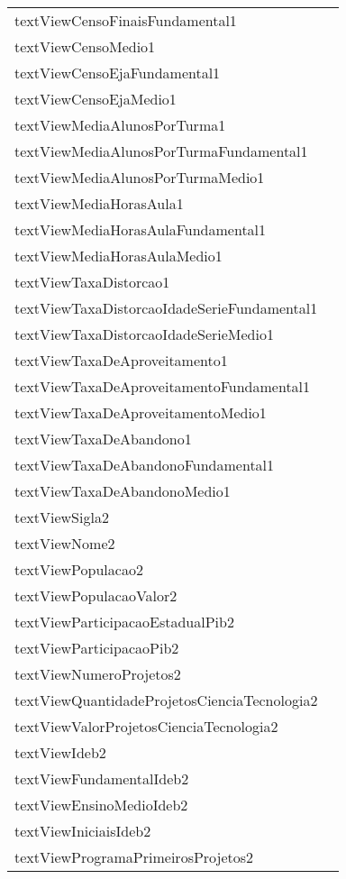 \documentclass[12pt]{article}
\begin{document}
\begin{table}[H]
\begin{center}
\begin{tabular}{l | l}
						textViewCensoFinaisFundamental1 & \\
						textViewCensoMedio1 & \\
						textViewCensoEjaFundamental1 & \\
						textViewCensoEjaMedio1 & \\
						textViewMediaAlunosPorTurma1 & \\
						textViewMediaAlunosPorTurmaFundamental1 & \\
						textViewMediaAlunosPorTurmaMedio1 & \\
						textViewMediaHorasAula1 & \\
						textViewMediaHorasAulaFundamental1 & \\
						textViewMediaHorasAulaMedio1 & \\
						textViewTaxaDistorcao1 & \\
						textViewTaxaDistorcaoIdadeSerieFundamental1 & \\
						textViewTaxaDistorcaoIdadeSerieMedio1 & \\
						textViewTaxaDeAproveitamento1 & \\
						textViewTaxaDeAproveitamentoFundamental1 & \\
						textViewTaxaDeAproveitamentoMedio1 & \\
						textViewTaxaDeAbandono1 & \\
						textViewTaxaDeAbandonoFundamental1 & \\
						textViewTaxaDeAbandonoMedio1 & \\
						textViewSigla2 & \\
						textViewNome2 & \\
						textViewPopulacao2 & \\
						textViewPopulacaoValor2 & \\
						textViewParticipacaoEstadualPib2 & \\
						textViewParticipacaoPib2 & \\
						textViewNumeroProjetos2 & \\
						textViewQuantidadeProjetosCienciaTecnologia2 & \\
						textViewValorProjetosCienciaTecnologia2 & \\
						textViewIdeb2 & \\
						textViewFundamentalIdeb2 & \\
						textViewEnsinoMedioIdeb2 & \\
						textViewIniciaisIdeb2 & \\
						textViewProgramaPrimeirosProjetos2 & \\

\end{tabular}
\end{center}
\end{table}
\end{document}
